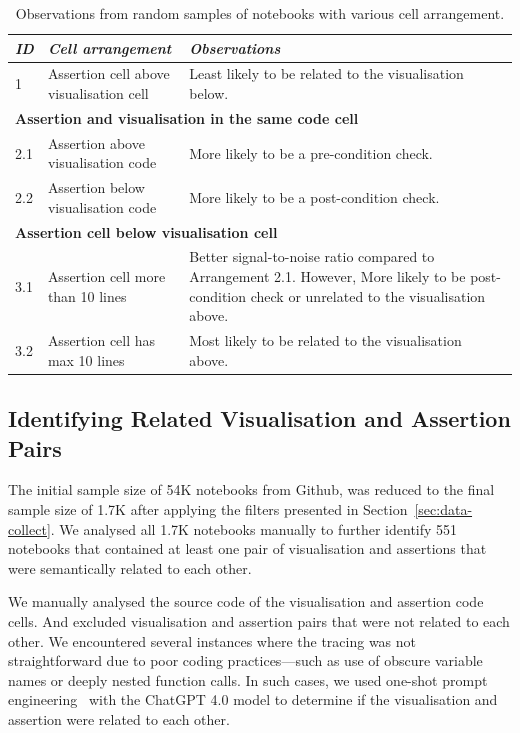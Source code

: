 \documentclass[conference]{IEEEtran}
\begin{document}
\begin{table}
  \centering
  \caption{Observations from random samples of notebooks with various
  cell arrangement.}
  \begin{tabular}{l p{} p{}}
    \hline
    \emph{\textbf{ID}}&
    \emph{\textbf{Cell arrangement}} &
    \emph{\textbf{Observations}}\\
    \hline
    1 &
    Assertion cell above visualisation cell &
    Least likely to be related to the visualisation below.\\
    \hline
    \multicolumn{3}{l}{\textbf{Assertion and visualisation in the same code cell}}\\
    \hline
    2.1 &
    Assertion above visualisation code &
    More likely to be a pre-condition check.\\
    2.2 &
    Assertion below visualisation code &
    More likely to be a post-condition check.\\
    \hline
    \multicolumn{3}{l}{\textbf{Assertion cell below visualisation cell}}\\
    \hline
    3.1 &
    Assertion cell more than 10 lines &
    Better signal-to-noise ratio compared to Arrangement 2.1. However, More likely to be post-condition check or unrelated to the visualisation above.\\
    3.2 &
    Assertion cell has max 10 lines &
    Most likely to be related to the visualisation above.\\
    \hline
  \end{tabular}
  \label{tab:cell-arrangement}
\end{table}

\subsection{Identifying Related Visualisation and Assertion Pairs}\label{sec:identify-related-pairs}

The initial sample size of 54K notebooks from Github, was reduced to the final sample size of 1.7K after applying the filters presented in Section~\ref{sec:data-collect}. We analysed all 1.7K notebooks manually to further identify 551 notebooks that contained at least one pair of visualisation and assertions that were semantically related to each other.

We manually analysed the source code of the visualisation and assertion code cells. And excluded visualisation and assertion pairs that were not related to each other. We encountered several instances where the tracing was not straightforward due to poor coding practices---such as use of obscure variable names or deeply nested function calls. In such cases, we used one-shot prompt engineering~\cite{CITME} with the ChatGPT 4.0 model to determine if the visualisation and assertion were related to each other.
\end{document}
